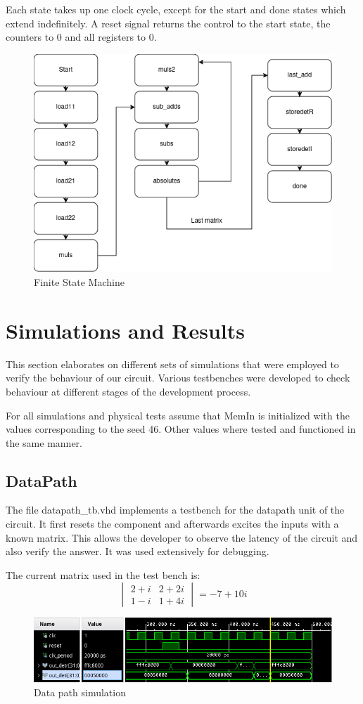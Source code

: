 \documentclass[12pt]{article}
\begin{document}
Each state takes up one clock cycle, except for the start and done states which extend indefinitely. A reset signal returns the control to the start state, the counters to 0 and all registers to 0.
\begin{figure}[H]
	\centering
	\includegraphics[width=0.55\linewidth]{images/FSM_lab3.png}
	\caption{Finite State Machine}
	\label{fig:fsm}
\end{figure}

\section{Simulations and Results}
This section elaborates on different sets of simulations that were employed to verify the behaviour of our circuit. Various testbenches were developed to check behaviour at different stages of the development process.

For all simulations and physical tests assume that MemIn is initialized with the values corresponding to the seed 46. Other values where tested and functioned in the same manner.
\subsection{DataPath}
The file datapath\_tb.vhd implements a testbench for the datapath unit of the circuit. 
It first resets the component and afterwards excites the inputs with a known matrix. This allows the developer to observe the latency of the circuit and also verify the answer. It was used extensively for debugging. 

The current matrix used in the test bench is:
\begin{equation*}
	\begin{vmatrix} 2+i & 2+2i \\ 
					1-i & 1+4i 
	\end{vmatrix} 
	= -7 + 10i
\end{equation*}

\begin{figure}[!htp]
	\centering
	\includegraphics[width=0.5\linewidth]{images/simDataPath.png}
	\caption{Data path simulation}
	\label{fig:simData}
\end{figure}
\end{document}
